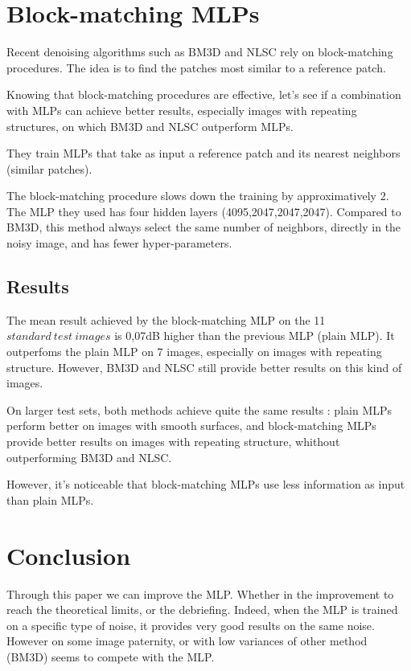 \documentclass[10pt,a4paper]{article}
\begin{document}
\section{Block-matching MLPs}

Recent denoising algorithms such as BM3D and NLSC rely on block-matching procedures. The idea is to find the patches most similar to a reference patch.

Knowing that block-matching procedures are effective, let's see if a combination with MLPs can achieve better results, especially images with repeating structures, on which BM3D and NLSC outperform MLPs.

They train MLPs that take as input a reference patch and its nearest neighbors (similar patches).

The block-matching procedure slows down the training by approximatively 2. The MLP they used has four hidden layers (4095,2047,2047,2047). Compared to BM3D, this method always select the same number of neighbors, directly in the noisy image, and has fewer hyper-parameters.

\subsection{Results}

The mean result achieved by the block-matching MLP on the 11 $standard\ test\ images$ is 0,07dB higher than the previous MLP (plain MLP). It outperfoms the plain MLP on 7 images, especially on images with repeating structure. However, BM3D and NLSC still provide better results on this kind of images.

On larger test sets, both methods achieve quite the same results : plain MLPs perform better on images with smooth surfaces, and block-matching MLPs provide better results on images with repeating structure, whithout outperforming BM3D and NLSC.

However, it's noticeable that block-matching MLPs use less information as input than plain MLPs.

\section{Conclusion}

Through this paper we can improve the MLP. Whether in the improvement to reach the theoretical limits, or the debriefing. Indeed, when the MLP is trained on a specific type of noise, it provides very good results on the same noise. However on some image paternity, or with low variances of other method (BM3D) seems to compete with the MLP.

\printbibliography
\end{document}
